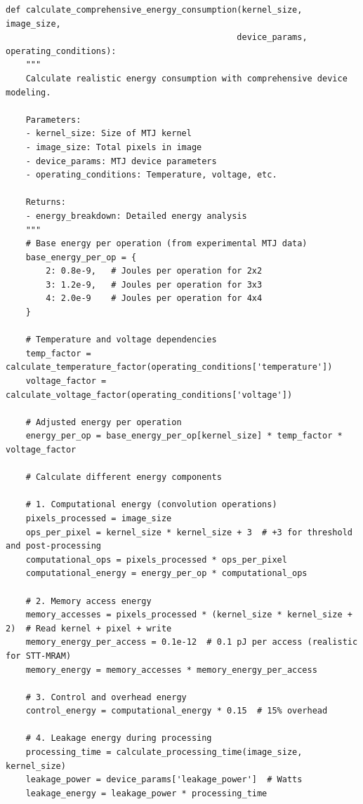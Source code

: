 \documentclass[conference]{IEEEtran}
\begin{document}
\begin{lstlisting}[caption={Comprehensive energy consumption calculation with device modeling}]
def calculate_comprehensive_energy_consumption(kernel_size, image_size, 
                                              device_params, operating_conditions):
    """
    Calculate realistic energy consumption with comprehensive device modeling.
    
    Parameters:
    - kernel_size: Size of MTJ kernel
    - image_size: Total pixels in image
    - device_params: MTJ device parameters
    - operating_conditions: Temperature, voltage, etc.
    
    Returns:
    - energy_breakdown: Detailed energy analysis
    """
    # Base energy per operation (from experimental MTJ data)
    base_energy_per_op = {
        2: 0.8e-9,   # Joules per operation for 2x2
        3: 1.2e-9,   # Joules per operation for 3x3  
        4: 2.0e-9    # Joules per operation for 4x4
    }
    
    # Temperature and voltage dependencies
    temp_factor = calculate_temperature_factor(operating_conditions['temperature'])
    voltage_factor = calculate_voltage_factor(operating_conditions['voltage'])
    
    # Adjusted energy per operation
    energy_per_op = base_energy_per_op[kernel_size] * temp_factor * voltage_factor
    
    # Calculate different energy components
    
    # 1. Computational energy (convolution operations)
    pixels_processed = image_size
    ops_per_pixel = kernel_size * kernel_size + 3  # +3 for threshold and post-processing
    computational_ops = pixels_processed * ops_per_pixel
    computational_energy = energy_per_op * computational_ops
    
    # 2. Memory access energy
    memory_accesses = pixels_processed * (kernel_size * kernel_size + 2)  # Read kernel + pixel + write
    memory_energy_per_access = 0.1e-12  # 0.1 pJ per access (realistic for STT-MRAM)
    memory_energy = memory_accesses * memory_energy_per_access
    
    # 3. Control and overhead energy
    control_energy = computational_energy * 0.15  # 15% overhead
    
    # 4. Leakage energy during processing
    processing_time = calculate_processing_time(image_size, kernel_size)
    leakage_power = device_params['leakage_power']  # Watts
    leakage_energy = leakage_power * processing_time
    

\end{lstlisting}
\end{document}
